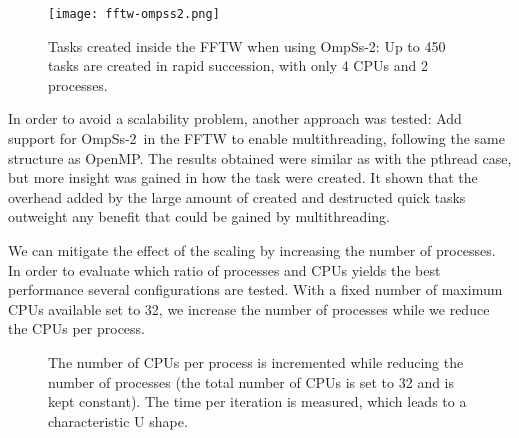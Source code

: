 \begin{figure}[h]
	\centering
	\texttt{[image: fftw-ompss2.png]}
	\caption{Tasks created inside the FFTW when using OmpSs-2: Up to 450 tasks are 
	created in rapid succession, with only 4 CPUs and 2 processes.}
	\label{fig:fftw-ompss2}
\end{figure}

In order to avoid a scalability problem, another approach was tested: Add 
support for OmpSs-2~in the FFTW to enable multithreading, following the same 
structure as OpenMP. The results obtained were similar as with the pthread case, 
but more insight was gained in how the task were created. It shown that the 
overhead added by the large amount of created and destructed quick tasks 
outweight any benefit that could be gained by multithreading.


We can mitigate the effect of the scaling by increasing the number of processes.  
In order to evaluate which ratio of processes and CPUs yields the best 
performance several configurations are tested. With a fixed number of maximum 
CPUs available set to 32, we increase the number of processes while we reduce 
the CPUs per process.


\begin{figure}[h]
	\centering
	\caption{The number of CPUs per process is incremented while reducing the 
	number of processes (the total number of CPUs is set to 32 and is kept 
	constant).  The time per iteration is measured, which leads to a 
	characteristic U shape.}
\end{figure}

